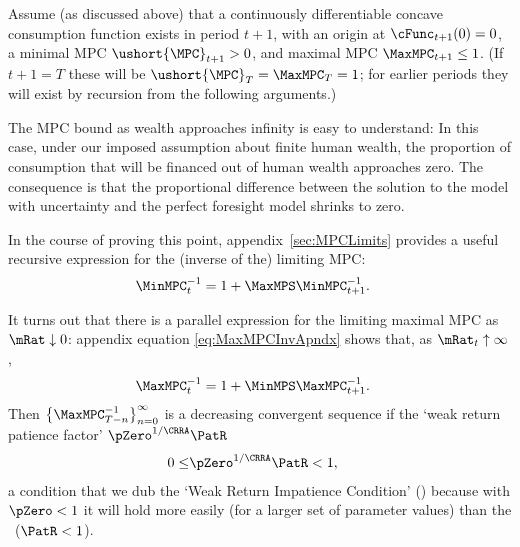 \documentclass[./BufferStockTheory.tex]{subfiles}
\begin{document}
\newcommand{\NewMaxMinMPC}{\ushort{\MPC}}

Assume (as discussed above) that a continuously differentiable
concave consumption function exists in period $t+1$, with an origin at
$\cFunc_{t+1}(0)=0$, a minimal MPC $\NewMaxMinMPC_{t+1}>0$, and
maximal MPC $\MaxMPC_{t+1} \leq 1$.  (If $t+1 = T$ these will be
$\NewMaxMinMPC_{T}=\MaxMPC_{T}=1$; for earlier periods they will exist
by recursion from the following arguments.)

The MPC bound as wealth approaches infinity is easy to understand: In this case,
under our imposed assumption about finite human wealth, the proportion of consumption
that will be financed out of human wealth approaches zero. The
consequence is that the proportional difference between the solution to the
model with uncertainty and the perfect foresight model shrinks to zero.

\hypertarget{MPCnvrsLower}{}
In the course of proving this point, appendix~\ref{sec:MPCLimits}  provides a useful recursive expression for the (inverse of the) limiting MPC: 
\begin{equation}\begin{gathered}\begin{aligned}
 \MinMPC_{t}^{-1}  & = 1+\MaxMPS \MinMPC_{t+1}^{-1} \label{eq:MinMPCInv}.
\end{aligned}\end{gathered}\end{equation}

\hypertarget{MPCnvrsUpper}{}
\hypertarget{WRIC}{}
It turns out that there is a parallel expression for the limiting maximal 
 MPC as $\mRat \downarrow 0$: appendix equation \eqref{eq:MaxMPCInvApndx}  shows that, as $\mRat_{t} \uparrow \infty$,
\begin{equation}\begin{gathered}\begin{aligned}
 \MaxMPC_{t}^{-1}  & = 1+\MinMPS \MaxMPC_{t+1}^{-1} \label{eq:MaxMPCInv}.
\end{aligned}\end{gathered}\end{equation}
\hypertarget{WRIF}{}  
Then
$\left\{\MaxMPC_{T-n}^{-1}\right\} _{n=0}^{\infty}$ is a decreasing %
convergent sequence if the `weak return patience factor' $\pZero^{1/\CRRA}\PatR$ 
\begin{equation}\begin{gathered}\begin{aligned}
  0 \leq & \pZero^{1/\CRRA} \PatR < 1 \label{eq:WRIC},
\end{aligned}\end{gathered}\end{equation}
a condition that we dub the `Weak Return Impatience Condition' (\WRIC)
because with $\pZero < 1$ it will hold more easily (for a larger set of parameter
values) than the \RIC~($\PatR < 1$).
\end{document}
